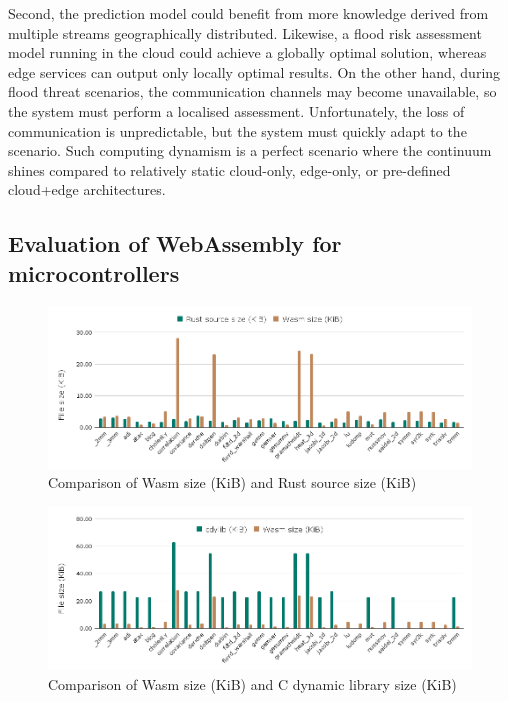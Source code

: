 Second, the prediction model could benefit from more knowledge derived from multiple streams geographically distributed. Likewise, a flood risk assessment model running in the cloud could achieve a globally optimal solution, whereas edge services can output only locally optimal results. On the other hand, during flood threat scenarios, the communication channels may become unavailable, so the system must perform a localised assessment. Unfortunately, the loss of communication is unpredictable, but the system must quickly adapt to the scenario. Such computing dynamism is a perfect scenario where the continuum shines compared to relatively static cloud-only, edge-only, or pre-defined cloud+edge architectures.

\subsection{Evaluation of WebAssembly for microcontrollers}

\begin{figure}[ht]
\centering
\includegraphics[width=\columnwidth]{figures/b-wasmi-2}
\caption{Comparison of Wasm size (KiB) and Rust source size (KiB) \label{fig:b-wasmi-2}}
\end{figure}

\begin{figure}[ht]
\centering
\includegraphics[width=\columnwidth]{figures/b-wasmi-3}
\caption{Comparison of Wasm size (KiB) and C dynamic library size (KiB) \label{fig:b-wasmi-3}}
\end{figure}

